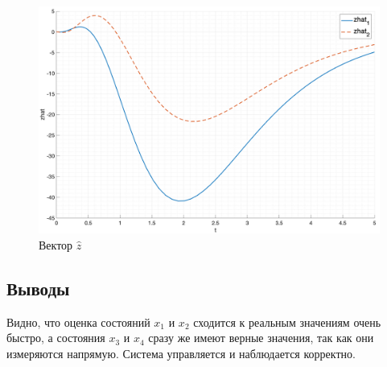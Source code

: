\begin{figure}
    \centering
    \includegraphics[width=\textwidth]{media/plots/task4_zhat_1.png}
    \caption{Вектор $\hat{z}$}
    \label{fig:task4_zhat_1}
\end{figure}

\FloatBarrier
\subsection{Выводы}
Видно, что оценка состояний $x_1$ и $x_2$ сходится к реальным значениям очень быстро, а 
состояния $x_3$ и $x_4$ сразу же имеют верные значения, так как они измеряются напрямую. 
Система управляется и наблюдается корректно.